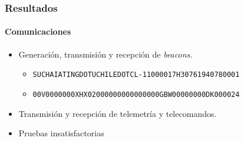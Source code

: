 \documentclass[xcolor=dvipsnames]{beamer}
\begin{document}
    \begin{frame}
    \frametitle{Resultados}
    \framesubtitle{Comunicaciones}
        
        \begin{itemize}
            \item Generación, transmisión y recepción de \textit{beacons}.
            \begin{itemize}
                \item \texttt{SUCHAIATINGDOTUCHILEDOTCL-11000017H30761940780001}
                \item \texttt{00V0000000XHX02000000000000000GBW00000000DK000024}
            \end{itemize}
            \item Transmisión y recepción de telemetría y telecomandos.
            \item  \alert{Pruebas insatisfactorias}
        \end{itemize}


\end{frame}
\end{document}
